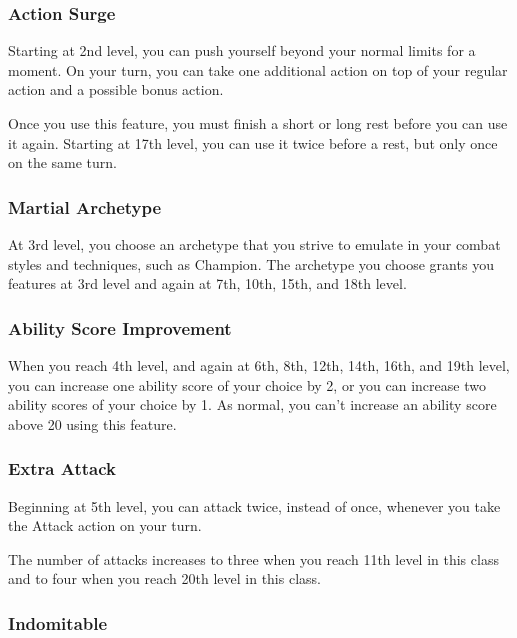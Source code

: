 \documentclass[
]{article}
\begin{document}
\hypertarget{action-surge}{%
\subsubsection{Action Surge}\label{action-surge}}

Starting at 2nd level, you can push yourself beyond your normal limits
for a moment. On your turn, you can take one additional action on top of
your regular action and a possible bonus action.

Once you use this feature, you must finish a short or long rest before
you can use it again. Starting at 17th level, you can use it twice
before a rest, but only once on the same turn.

\hypertarget{martial-archetype}{%
\subsubsection{Martial Archetype}\label{martial-archetype}}

At 3rd level, you choose an archetype that you strive to emulate in your
combat styles and techniques, such as Champion. The archetype you choose
grants you features at 3rd level and again at 7th, 10th, 15th, and 18th
level.

\hypertarget{ability-score-improvement}{%
\subsubsection{Ability Score
Improvement}\label{ability-score-improvement}}

When you reach 4th level, and again at 6th, 8th, 12th, 14th, 16th, and
19th level, you can increase one ability score of your choice by 2, or
you can increase two ability scores of your choice by 1. As normal, you
can't increase an ability score above 20 using this feature.

\hypertarget{extra-attack}{%
\subsubsection{Extra Attack}\label{extra-attack}}

Beginning at 5th level, you can attack twice, instead of once, whenever
you take the Attack action on your turn.

The number of attacks increases to three when you reach 11th level in
this class and to four when you reach 20th level in this class.

\hypertarget{indomitable}{%
\subsubsection{Indomitable}\label{indomitable}}
\end{document}
